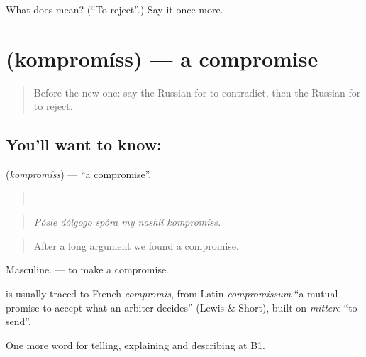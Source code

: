 \begin{tcolorbox}[breakable,colback=teal!4,colframe=teal!35!black,title={Before you move on}]
What does  mean? (\textquotedblleft{}To reject\textquotedblright{}.) Say it once more.
\end{tcolorbox}
\section[\texorpdfstring{\ru{компромисс} (kompromíss)}{компромисс (kompromíss)}]{ (kompromíss) — a compromise}

\label{lesson:RU-C341-kompromiss}



\begin{quote}
Before the new one: say the Russian for to contradict, then the Russian for to reject.
\end{quote}

\subsection*{You'll want to know: }
\textbf{} (\emph{kompromíss}) — \textquotedblleft{}a compromise\textquotedblright{}.

\begin{quote}
     .
\end{quote}

\begin{quote}
\emph{Pósle dólgogo spóra my nashlí kompromíss.}
\end{quote}

\begin{quote}
After a long argument we found a compromise.
\end{quote}

Masculine. \emph{  } — to make a compromise.

\begin{cousinweb}
\textbf{} is usually traced to French \emph{compromis}, from Latin \emph{compromissum} \textquotedblleft{}a mutual promise to accept what an arbiter decides\textquotedblright{} (Lewis \& Short), built on \emph{mittere} \textquotedblleft{}to send\textquotedblright{}.
\end{cousinweb}

\begin{grammarlens}[title={What you've built}]
One more word for telling, explaining and describing at B1.
\end{grammarlens}

